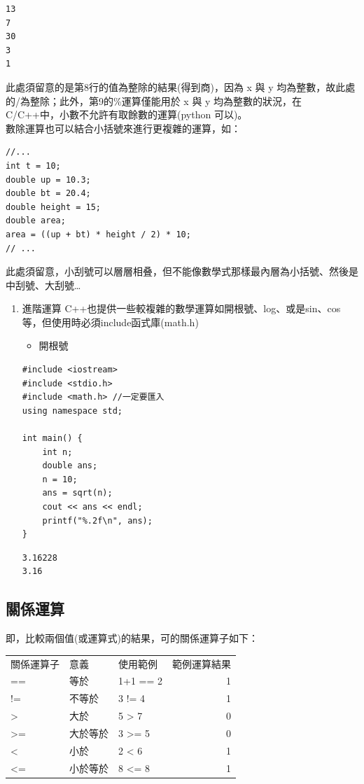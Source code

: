 \documentclass[a4paper,12pt]{article}
\begin{document}
\begin{verbatim}
13
7
30
3
1
\end{verbatim}


此處須留意的是第8行的值為整除的結果(得到商)，因為 x 與 y 均為整數，故此處的/為整除；此外，第9的\%運算僅能用於 x 與 y 均為整數的狀況，在 C/C++中，小數不允許有取餘數的運算(python 可以)。\\

數除運算也可以結合小括號來進行更複雜的運算，如：\\
\lstset{breaklines=true,language=cpp,label= ,caption= ,captionpos=b,firstnumber=1,numbers=left}
\begin{lstlisting}
//...
int t = 10;
double up = 10.3;
double bt = 20.4;
double height = 15;
double area;
area = ((up + bt) * height / 2) * 10;
// ...
\end{lstlisting}

此處須留意，小刮號可以層層相叠，但不能像數學式那樣最內層為小括號、然後是中刮號、大刮號\ldots{}\\

\begin{enumerate}
\item 進階運算
\label{sec:orgcf37165}
C++也提供一些較複雜的數學運算如開根號、log、或是sin、cos等，但使用時必須include函式庫(math.h)\\
\begin{itemize}
\item 開根號\\
\end{itemize}
\lstset{breaklines=true,language=cpp,label= ,caption= ,captionpos=b,firstnumber=1,numbers=left}
\begin{lstlisting}
#include <iostream>
#include <stdio.h>
#include <math.h> //一定要匯入
using namespace std;

int main() {
    int n;
    double ans;
    n = 10;
    ans = sqrt(n);
    cout << ans << endl;
    printf("%.2f\n", ans);
}
\end{lstlisting}

\begin{verbatim}
3.16228
3.16
\end{verbatim}
\end{enumerate}

\subsection{關係運算}
\label{cpp_cond_operation}
即，比較兩個值(或運算式)的結果，可的關係運算子如下：\\
\begin{center}
\begin{tabular}{lllr}
關係運算子 & 意義 & 使用範例 & 範例運算結果\\
== & 等於 & 1+1 == 2 & 1\\
!= & 不等於 & 3 != 4 & 1\\
> & 大於 & 5 > 7 & 0\\
>= & 大於等於 & 3 >= 5 & 0\\
< & 小於 & 2 < 6 & 1\\
<= & 小於等於 & 8 <= 8 & 1\\
\end{tabular}
\end{center}
\end{document}
